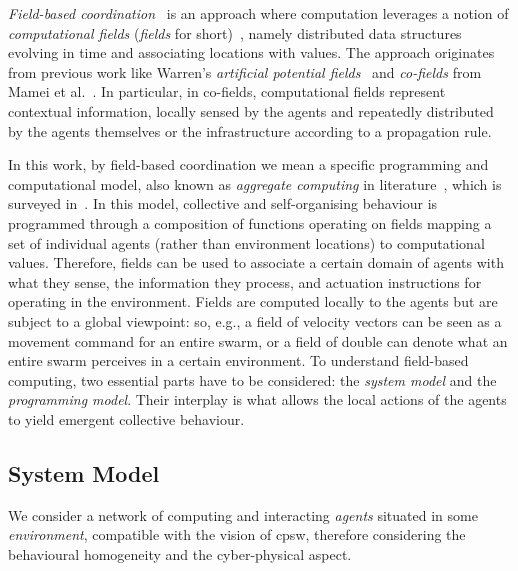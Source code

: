 \emph{Field-based coordination}~\cite{DBLP:journals/jlap/ViroliBDACP19}
 is an approach
 where computation leverages
 a notion of \emph{computational fields} (\emph{fields} for short)~\cite{DBLP:conf/icra/Warren89,DBLP:journals/pervasive/MameiZL04,DBLP:journals/jlap/ViroliBDACP19}, namely
 distributed data structures evolving in time and associating locations with values.
%
The approach originates from previous work
 like
 Warren's \emph{artificial potential fields}~\cite{DBLP:conf/icra/Warren89}
 and
 \emph{co-fields} from Mamei et al.~\cite{DBLP:journals/pervasive/MameiZL04}.
%
In particular, in co-fields, computational fields represent contextual information, 
 locally sensed by the agents and repeatedly distributed by the agents themselves or the infrastructure according to a propagation rule.

In this work, by field-based coordination we mean a specific programming and computational model,
 also known as \emph{aggregate computing} in literature~\cite{aggregatecomputing},
 which is surveyed in~\cite{DBLP:journals/jlap/ViroliBDACP19}.
In this model,  
 collective and self-organising behaviour
 is programmed through a composition
 of functions operating on fields
 mapping a set of individual agents (rather than environment locations)
 to computational values.
%
Therefore, fields can be used to associate a certain domain of agents
 with what they sense, the information they process, and actuation instructions for operating in the environment.
%
Fields are computed locally to the agents
 but are subject to a global viewpoint:
 so, e.g., a field of velocity vectors can be seen as a movement command for an entire swarm, or
 a field of double can denote what an entire swarm perceives in a certain environment.
%
To understand field-based computing,
 two essential parts have to be considered: the \emph{system model}
 and the \emph{programming model}.
 Their interplay is what allows the local actions of the agents
 to yield emergent collective behaviour.

\subsection{System Model}\label{ssec:background:sysmodel}
We consider a network of computing and interacting \emph{agents} situated in some \emph{environment},
 compatible with the vision of \acf{cpsw}, therefore considering the behavioural homogeneity and the 
 cyber-physical aspect. 

